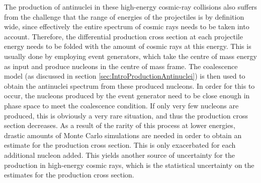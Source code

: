 The production of antinuclei in these high-energy cosmic-ray collisions also suffers from the challenge that the range of energies of the projectiles is by definition wide, since effectively the entire spectrum of cosmic rays needs to be taken into account. Therefore, the differential production cross section at each projectile energy needs to be folded with the amount of cosmic rays at this energy. This is usually done by employing event generators, which take the centre of mass energy as input and produce nucleons in the centre of mass frame. The coalescence model (as discussed in section \ref{sec:IntroProductionAntinuclei}) is then used to obtain the antinuclei spectrum from these produced nucleons. In order for this to occur, the nucleons produced by the event generator need to be close enough in phase space to meet the coalescence condition. If only very few nucleons are produced, this is obviously a very rare situation, and thus the production cross section decreases. As a result of the rarity of this process at lower energies, drastic amounts of Monte Carlo simulations are needed in order to obtain an estimate for the production cross section. This is only exacerbated for each additional nucleon added. This yields another source of uncertainty for the production in high-energy cosmic rays, which is the statistical uncertainty on the estimates for the production cross section.\\




